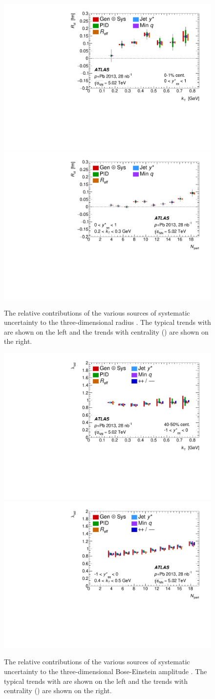 \begin{figure}[t]
\centering
\includegraphics[width=0.49\linewidth]{canqosl_Rol_vs_kt_systs.pdf}
\includegraphics[width=0.49\linewidth]{canqosl_Rol_vs_npart_systs.pdf}\\
\caption{The relative contributions of the various sources of systematic uncertainty to the three-dimensional radius \Rol. The typical trends with \kt are shown on the left and the trends with centrality (\Npart) are shown on the right.}
\label{fig:syst_rol}
\end{figure}

\begin{figure}[t]
\centering
\includegraphics[width=0.49\linewidth]{canqosl_x_vs_kt_systs.pdf}
\includegraphics[width=0.49\linewidth]{canqosl_x_vs_npart_systs.pdf}\\
\caption{The relative contributions of the various sources of systematic uncertainty to the three-dimensional Bose-Einstein amplitude \losl. The typical trends with \kt are shown on the left and the trends with centrality (\Npart) are shown on the right.}
\label{fig:syst_losl}
\end{figure}

